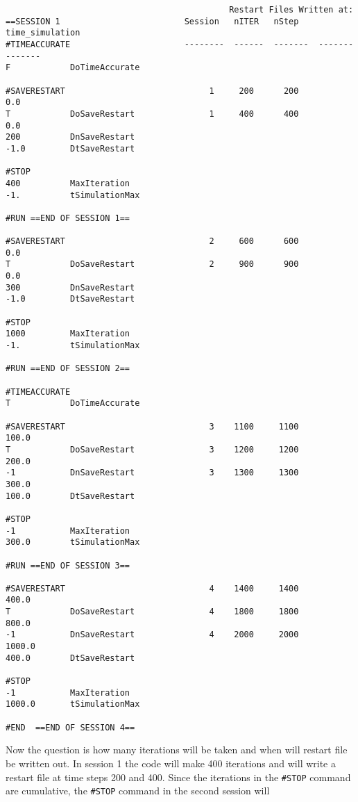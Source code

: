 \begin{verbatim}
                                             Restart Files Written at:
==SESSION 1                         Session   nITER   nStep    time_simulation
#TIMEACCURATE                       --------  ------  -------  --------------
F            DoTimeAccurate  

#SAVERESTART                             1     200      200             0.0  
T            DoSaveRestart               1     400      400             0.0
200          DnSaveRestart
-1.0         DtSaveRestart

#STOP
400          MaxIteration
-1.          tSimulationMax

#RUN ==END OF SESSION 1== 
                         
#SAVERESTART                             2     600      600             0.0
T            DoSaveRestart               2     900      900             0.0
300          DnSaveRestart
-1.0         DtSaveRestart
				
#STOP				
1000         MaxIteration				
-1.          tSimulationMax
				
#RUN ==END OF SESSION 2== 

#TIMEACCURATE
T            DoTimeAccurate  		
				
#SAVERESTART                             3    1100     1100           100.0
T            DoSaveRestart               3    1200     1200           200.0
-1           DnSaveRestart               3    1300     1300           300.0
100.0        DtSaveRestart
				
#STOP				
-1           MaxIteration				
300.0        tSimulationMax			
				
#RUN ==END OF SESSION 3== 
                          
#SAVERESTART                             4    1400     1400           400.0
T            DoSaveRestart               4    1800     1800           800.0
-1           DnSaveRestart               4    2000     2000          1000.0
400.0        DtSaveRestart
 				
#STOP				
-1           MaxIteration				
1000.0       tSimulationMax				
				
#END  ==END OF SESSION 4== 
\end{verbatim}
Now the question is how many iterations will be taken and when will restart
file be written out.  In session 1 the code will make 400 iterations and will
write a restart file at time steps 200 and 400.  Since the iterations 
in the {\tt \#STOP}
command are cumulative, the {\tt \#STOP} command in the second session will
